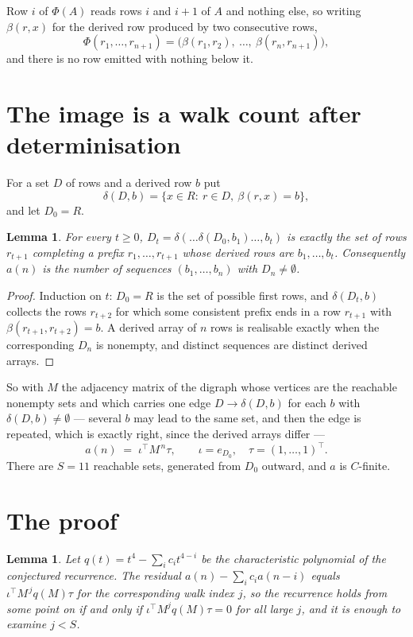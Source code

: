 \documentclass[11pt,a4paper]{article}
\theoremstyle{plain}
\newtheorem{lemma}[theorem]{Lemma}
\theoremstyle{definition}
\begin{document}
Row $i$ of $\Phi(A)$ reads rows $i$ and $i+1$ of $A$ and nothing else, so
writing $\beta(r,x)$ for the derived row produced by two consecutive rows,
\[
\Phi(r_1,\dots,r_{n+1})=\bigl(\beta(r_1,r_2),\ \dots,\ \beta(r_n,r_{n+1})\bigr),
\]
and there is no row emitted with nothing below it.

\section{The image is a walk count after determinisation}

For a set $D$ of rows and a derived row $b$ put
\[
\delta(D,b)=\{x\in R:\ r\in D,\ \beta(r,x)=b\},
\]
and let $D_0=R$.

\begin{lemma}\label{lem:det}
For every $t\ge0$, $D_t=\delta(\dots\delta(D_0,b_1)\dots,b_t)$ is exactly the set of rows
$r_{t+1}$ completing a prefix $r_1,\dots,r_{t+1}$ whose derived rows are $b_1,\dots,b_t$.
Consequently $a(n)$ is the number of sequences $(b_1,\dots,b_n)$ with $D_n\neq\emptyset$.
\end{lemma}

\begin{proof}
Induction on $t$: $D_0=R$ is the set of possible first rows, and $\delta(D_t,b)$ collects the
rows $r_{t+2}$ for which some consistent prefix ends in a row $r_{t+1}$ with
$\beta(r_{t+1},r_{t+2})=b$. A derived array of $n$ rows is realisable exactly when the
corresponding $D_n$ is nonempty, and distinct sequences are distinct derived arrays.
\end{proof}

So with $M$ the adjacency matrix of the digraph whose vertices are the reachable nonempty sets
and which carries one edge $D\to\delta(D,b)$ for each $b$ with $\delta(D,b)\neq\emptyset$ ---
several $b$ may lead to the same set, and then the edge is repeated, which is exactly right,
since the derived arrays differ ---
\[
a(n)\;=\;\iota^{\!\top}M^{\,n}\tau,\qquad \iota=e_{D_0},\quad \tau=(1,\dots,1)^{\!\top} .
\]
There are $S=11$ reachable sets, generated from $D_0$ outward, and $a$ is $C$-finite.


\section{The proof}

\begin{lemma}\label{lem:crit}
Let $q(t)=t^{4}-\sum_i c_it^{4-i}$ be the characteristic polynomial of the
conjectured recurrence. The residual $a(n)-\sum_ic_ia(n-i)$ equals
$\iota^{\!\top}M^{\,j}q(M)\tau$ for the corresponding walk index $j$, so the recurrence
holds from some point on if and only if $\iota^{\!\top}M^{j}q(M)\tau=0$ for all large $j$,
and it is enough to examine $j<S$.
\end{lemma}
\end{document}
